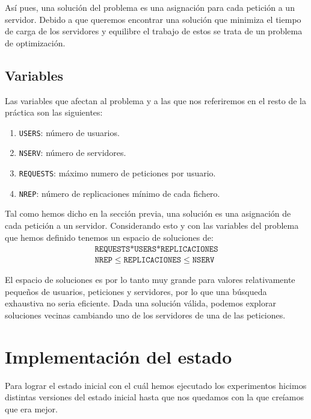 Así pues, una solución del problema es una asignación para cada petición a un servidor. Debido a que queremos encontrar
una solución que minimiza el tiempo de carga de los servidores y equilibre el trabajo de estos se trata de un problema
de optimización.

\pagebreak
\subsection{Variables}%
\label{ssec:variables}



Las variables que afectan al problema y a las que nos referiremos en el resto de la práctica son las siguientes:

\begin{enumerate}
    \item \texttt{USERS}: número de usuarios.
    \item \texttt{NSERV}: número de servidores.
    \item \texttt{REQUESTS}: máximo numero de peticiones por usuario.
    \item \texttt{NREP}: número de replicaciones mínimo de cada fichero.
\end{enumerate}

Tal como hemos dicho en la sección previa, una solución es una asignación de cada petición a un servidor. Considerando
esto y con las variables del problema que hemos definido tenemos un espacio de soluciones de:
\begin{align}
\texttt{REQUESTS*USERS*REPLICACIONES} \\
\texttt{NREP} \leq \texttt{REPLICACIONES} \leq \texttt{NSERV}
\end{align}

El espacio de soluciones es por lo tanto muy grande para valores relativamente pequeños de usuarios, peticiones y
servidores, por lo que una búsqueda exhaustiva no seria eficiente. Dada una solución válida,
podemos explorar soluciones vecinas cambiando uno de los servidores de una de las peticiones. 

\section{Implementación del estado}

Para lograr el estado inicial con el cuál hemos ejecutado los experimentos hicimos distintas versiones del estado inicial hasta que nos quedamos con la que creíamos que era mejor.

